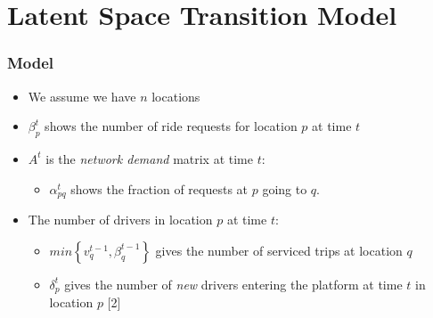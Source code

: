 \documentclass[t]{beamer}
\begin{document}
\section{Latent Space Transition Model}
\begin{frame}\frametitle{Model}
\begin{itemize}
\item We assume we have $n$ locations
\item<2-> $\beta_p^t$ shows the number of ride requests for location $p$ at time $t$
\item<3-> $A^t$ is the \textit{network demand} matrix at time $t$:
\begin{itemize}
\item<3-> $\alpha_{pq}^t$ shows the fraction of requests at $p$ going to $q$.
\end{itemize} 
\item<4-> The number of drivers in location $p$ at time $t$:
\vspace{-0.1in}
\begin{itemize}
\item<5-> $min \left\lbrace v_q^{t-1}, \beta_q^{t-1} \right\rbrace$ gives the number of serviced trips at location $q$
\item<6-> $\delta_p^t$ gives the number of \textit{new} drivers entering the platform at time $t$ in location $p$ [2]
\end{itemize}
\end{itemize}
\end{frame}
\end{document}
